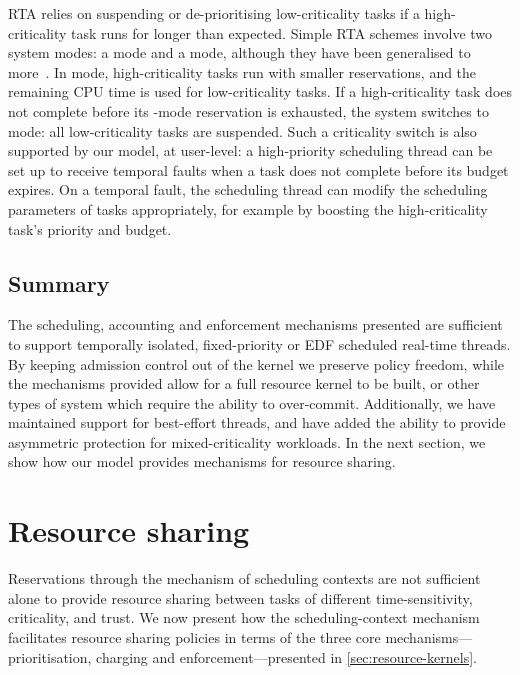 \gls{RTA} relies on suspending or de-prioritising low-criticality tasks if a high-criticality
task runs for longer than expected.  Simple \gls{RTA} schemes involve two system modes:
a  mode and a  mode, although they have been generalised to
more~\citep{Fleming_Burns_13}.  In  mode, high-criticality tasks run with smaller 
reservations, and the remaining
CPU time is used for low-criticality tasks.  If a high-criticality task does not complete before its
-mode reservation is exhausted, the system switches to  mode: all low-criticality
tasks are suspended.  Such a criticality switch is also supported by our model, at user-level: a high-priority scheduling thread can be
set up to receive temporal faults when a task does not complete before its budget expires.  On a
temporal fault, the scheduling thread can modify the scheduling parameters of tasks appropriately,
for example by boosting the high-criticality task's priority and budget.

\subsection{Summary}

The scheduling, accounting and enforcement mechanisms presented are sufficient to support temporally
isolated, fixed-priority or \gls{EDF} scheduled real-time threads. By keeping admission control
out of the kernel we preserve policy freedom, while the mechanisms provided allow for a full
resource kernel to be built, or other types of system which require the ability to over-commit.
Additionally, we have maintained
support for best-effort threads, and have added the ability to provide asymmetric protection for
mixed-criticality workloads. 
In the next section, we show how our model provides mechanisms for resource sharing. 

\section{Resource sharing}\label{s:locking}

Reservations through the mechanism of scheduling contexts are not sufficient alone to provide
resource sharing between tasks of different time-sensitivity, criticality, and trust. We now
present how the scheduling-context mechanism facilitates resource sharing policies 
in terms of the three core mechanisms---prioritisation, charging and enforcement---presented 
in \cref{sec:resource-kernels}.

